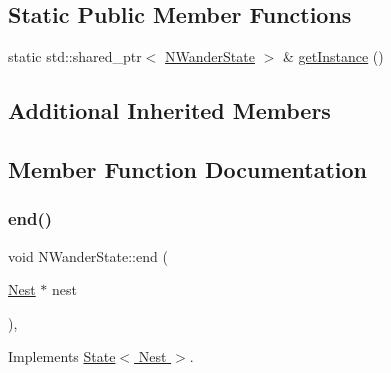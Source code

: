 \subsection*{Static Public Member Functions}
\begin{DoxyCompactItemize}
\item 
static std\+::shared\+\_\+ptr$<$ \hyperlink{class_n_wander_state}{N\+Wander\+State} $>$ \& \hyperlink{class_n_wander_state_a7e705fdb77af73c5dd8cfc8801f1a8ec}{get\+Instance} ()
\end{DoxyCompactItemize}
\subsection*{Additional Inherited Members}


\subsection{Member Function Documentation}
\mbox{\label{class_n_wander_state_acfff1d26985924da7d3c540a9399dd1d}} 
\subsubsection{\texorpdfstring{end()}{end()}}
{\footnotesize\ttfamily void N\+Wander\+State\+::end (\begin{DoxyParamCaption}\item[{\hyperlink{class_nest}{Nest} $\ast$}]{nest }\end{DoxyParamCaption})\hspace{0.3cm}{\ttfamily [override]}, {\ttfamily [virtual]}}



Implements \hyperlink{class_state_a97d058722f988c008e912a0e5ec879b3}{State$<$ Nest $>$}.

